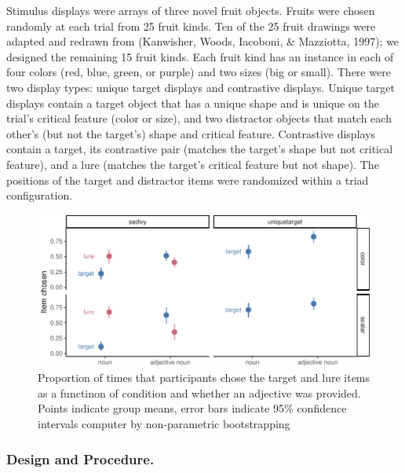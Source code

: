 \documentclass[10pt, letterpaper]{article}
\newenvironment{CodeChunk}{}{}
\begin{document}
Stimulus displays were arrays of three novel fruit objects. Fruits were
chosen randomly at each trial from 25 fruit kinds. Ten of the 25 fruit
drawings were adapted and redrawn from (Kanwisher, Woods, Iacoboni, \&
Mazziotta, 1997); we designed the remaining 15 fruit kinds. Each fruit
kind has an instance in each of four colors (red, blue, green, or
purple) and two sizes (big or small). There were two display types:
unique target displays and contrastive displays. Unique target displays
contain a target object that has a unique shape and is unique on the
trial's critical feature (color or size), and two distractor objects
that match each other's (but not the target's) shape and critical
feature. Contrastive displays contain a target, its contrastive pair
(matches the target's shape but not critical feature), and a lure
(matches the target's critical feature but not shape). The positions of
the target and distractor items were randomized within a triad
configuration.

\begin{CodeChunk}
\begin{figure}[tb]

{\centering \includegraphics{figs/e1_fig-1} 

}

\caption[Proportion of times that participants chose the target and lure items as a functinon of condition and whether an adjective was provided]{Proportion of times that participants chose the target and lure items as a functinon of condition and whether an adjective was provided. Points indicate group means, error bars indicate 95\% confidence intervals computer by non-parametric bootstrapping}\label{fig:e1_fig}
\end{figure}
\end{CodeChunk}

\subsubsection{Design and Procedure.}\label{design-and-procedure.}
\end{document}
